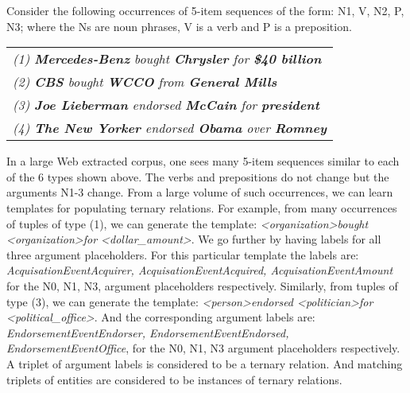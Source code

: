  Consider the following occurrences of 5-item sequences of the form: N1, V, N2, P, N3; where the Ns are noun phrases,  V is a verb and P is a preposition.
 \begin{table}[h]
    \small{
 \centering
 \begin{tabular}{p{7cm}}
 \textit{(1) \textbf{Mercedes-Benz}	bought	\textbf{Chrysler}	for	\textbf{\$40 billion}}\\
   \textit{(2) \textbf{CBS}	bought	\textbf{WCCO}	from	\textbf{General Mills}}\\
  \hline
  \textit{(3) \textbf{Joe Lieberman}	endorsed	\textbf{McCain}	for	\textbf{president}}\\
  \textit{(4) \textbf{The New Yorker}	endorsed	\textbf{Obama}	over	 \textbf{Romney}}\\
 \end{tabular}
 \label{tbl:example}
 }
 \end{table}

In a large Web extracted corpus, one sees many 5-item sequences similar to each of the 6 types shown above. The verbs and prepositions do not change but the arguments N1-3 change. From a large volume of such occurrences, we can learn templates for populating ternary relations. For example, from many occurrences of tuples of type (1), we can generate the template:   \textit{ \textless organization\textgreater	bought \textless organization\textgreater	for	\textless dollar\_amount\textgreater}. We go further by having labels for all three argument placeholders.  For this particular template the labels are: \textit{AcquisationEventAcquirer, AcquisationEventAcquired, AcquisationEventAmount} for the N0, N1, N3, argument placeholders respectively.
Similarly, from tuples of type (3), we can generate the template:   \textit{ \textless person\textgreater	endorsed \textless politician\textgreater	for	\textless political\_office\textgreater}. And the corresponding argument labels are: \textit{EndorsementEventEndorser,	EndorsementEventEndorsed,	EndorsementEventOffice}, for the N0, N1, N3 argument placeholders respectively. A triplet of argument labels is considered to be a ternary relation. And matching triplets of entities are considered to be instances of ternary relations.

